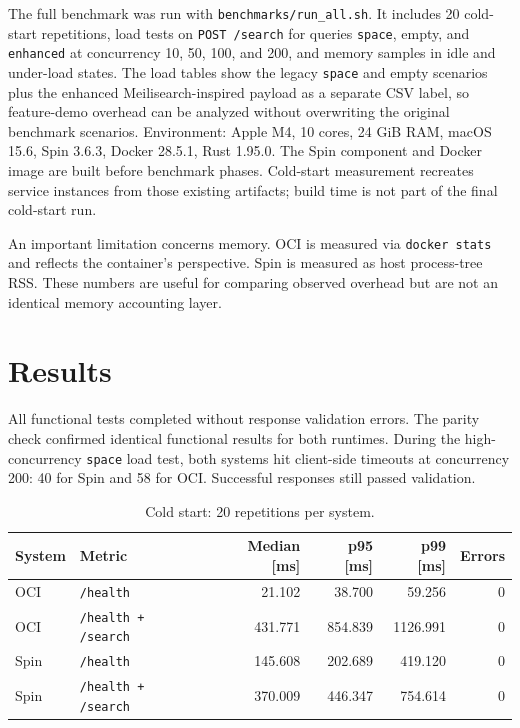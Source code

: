 \documentclass[11pt,a4paper]{article}
\begin{document}
The full benchmark was run with \texttt{benchmarks/run\_all.sh}. It includes 20 cold-start
repetitions, load tests on \texttt{POST /search} for queries \texttt{space}, empty, and
\texttt{enhanced} at concurrency 10, 50, 100, and 200, and memory samples in idle and
under-load states. The load tables show the legacy \texttt{space} and empty scenarios plus
the enhanced Meilisearch-inspired payload as a separate CSV label, so feature-demo overhead
can be analyzed without overwriting the original benchmark scenarios.
Environment: Apple M4, 10 cores, 24 GiB RAM, macOS 15.6, Spin 3.6.3, Docker 28.5.1, Rust
1.95.0. The Spin component and Docker image are built before benchmark phases. Cold-start
measurement recreates service instances from those existing artifacts; build time is not part
of the final cold-start run.

An important limitation concerns memory. OCI is measured via \texttt{docker stats} and reflects
the container's perspective. Spin is measured as host process-tree RSS. These numbers are useful
for comparing observed overhead but are not an identical memory accounting layer.

\section{Results}

All functional tests completed without response validation errors. The parity check confirmed
identical functional results for both runtimes. During the high-concurrency \texttt{space}
load test, both systems hit client-side timeouts at concurrency 200: 40 for Spin and 58 for
OCI. Successful responses still passed validation.

\begin{table}[H]
\centering
\caption{Cold start: 20 repetitions per system.}
\begin{tabular}{llrrrr}
\toprule
System & Metric & Median [ms] & p95 [ms] & p99 [ms] & Errors \\
\midrule
OCI & \texttt{/health} & 21.102 & 38.700 & 59.256 & 0 \\
OCI & \texttt{/health + /search} & 431.771 & 854.839 & 1126.991 & 0 \\
Spin & \texttt{/health} & 145.608 & 202.689 & 419.120 & 0 \\
Spin & \texttt{/health + /search} & 370.009 & 446.347 & 754.614 & 0 \\
\bottomrule
\end{tabular}
\end{table}
\end{document}
